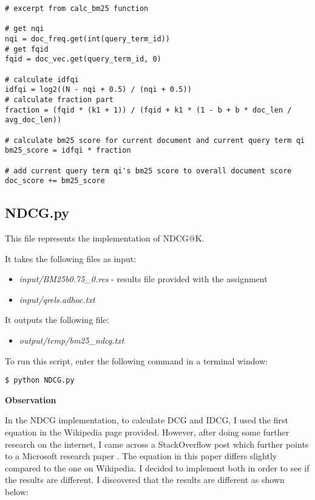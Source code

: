 \documentclass{article} %
\begin{document}
\begin{lstlisting}[style=Python]
# excerpt from calc_bm25 function

# get nqi
nqi = doc_freq.get(int(query_term_id))
# get fqid
fqid = doc_vec.get(query_term_id, 0)

# calculate idfqi
idfqi = log2((N - nqi + 0.5) / (nqi + 0.5))
# calculate fraction part
fraction = (fqid * (k1 + 1)) / (fqid + k1 * (1 - b + b * doc_len / avg_doc_len))

# calculate bm25 score for current document and current query term qi
bm25_score = idfqi * fraction

# add current query term qi's bm25 score to overall document score
doc_score += bm25_score

\end{lstlisting}

\subsection*{NDCG.py \cite{discountedcumulativegain}}

This file represents the implementation of NDCG@K.

It takes the following files as input:

\begin{itemize}
    \item \textit{input/BM25b0.75\_0.res} - results file provided with the assignment
    \item \textit{input/qrels.adhoc.txt}
\end{itemize}

It outputs the following file:

\begin{itemize}
    \item \textit{output/temp/bm25\_ndcg.txt}
\end{itemize}

To run this script, enter the following command in a terminal window:

\begin{lstlisting}[style=Bash]
  $ python NDCG.py
\end{lstlisting}

\textbf{Observation}

In the NDCG implementation, to calculate DCG and IDCG, I used the first equation in the Wikipedia \cite{discountedcumulativegain} page provided. However, after doing some further research on the internet, I came across a StackOverflow post \cite{stackoverflow} which further points to a Microsoft research paper \cite{sakai2014metrics}. The equation in this paper differs slightly compared to the one on Wikipedia. I decided to implement both in order to see if the results are different. I discovered that the results are different as shown below:
\end{document}
